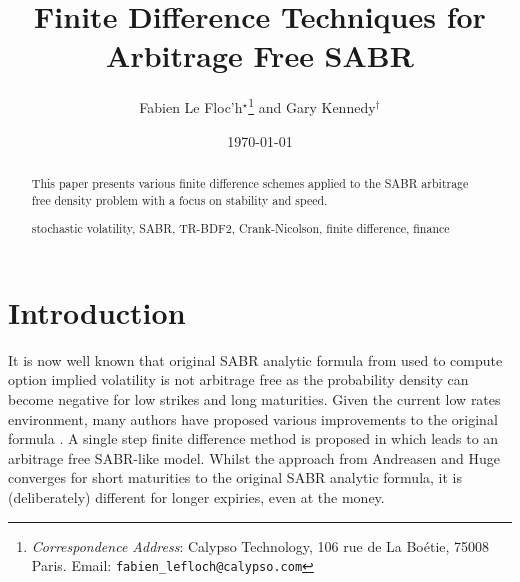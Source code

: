 \documentclass[]{rAMF2e}
\begin{document}
\doi{}
\issn{}  \issnp{}
\def\jobtag{}
\jname{}


\title{Finite Difference Techniques for Arbitrage Free SABR}
\author{Fabien {Le Floc'h}$^\star$\thanks{{\em{Correspondence Address}}: Calypso Technology, 106 rue de La Bo\'{e}tie, 75008 Paris. Email: \texttt{fabien\_lefloch@calypso.com} \vspace{6pt}} and Gary Kennedy$^\dag$}
%
\date{\today}

\maketitle
\newcommand{\sgn}{\mathop{\mathrm{sgn}}}
\begin{abstract}
This paper presents various finite difference schemes applied to the SABR arbitrage free density problem with a focus on stability and speed.
\begin{keywords}stochastic volatility, SABR, TR-BDF2, Crank-Nicolson, finite difference, finance\end{keywords}
\end{abstract}

\section{Introduction}
It is now well known that original SABR analytic formula from \citep{hagan2002managing} used to compute option implied volatility is not arbitrage free as the probability density can become negative for low strikes and long maturities. Given the current low rates environment, many authors have proposed various improvements to the original formula \citep{obloj2008fine, johnson2009arbitrage, paulot2009asymptotic, benaim2008arbitrage}.  A single step finite difference method is proposed in \citep{andreasen2011zabr} which leads to an arbitrage free SABR-like model. Whilst the approach from Andreasen and Huge converges for short maturities to the original SABR analytic formula, it is (deliberately) different for longer expiries, even at the money.
\end{document}
